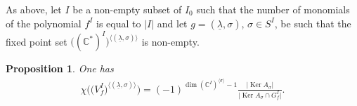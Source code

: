 \documentclass[11pt]{article}
\numberwithin{equation}{section}
\numberwithin{equation}{section}
\newtheorem{Proposition}[Theorem]{Proposition}
 { \theoremstyle{definition}
\newtheorem{Definition}[Theorem]{Definition}
\newtheorem{Remark}[Theorem]{Remark} }
\begin{document}
As above, let $I$ be a non-empty subset of $I_0$ such that the number of monomials of the polynomial $f^I$ is equal
to $|I|$ and let $g=(\underline{\lambda}, \sigma)$, $\sigma \in S^I$, be such that the fixed point set
$\big(({\mathbb C}^*)^I\big)^{\langle (\underline{\lambda}, \sigma) \rangle}$ is non-empty.

\begin{Proposition} \label{prop:Euler} One has
\begin{gather} \label{eq:Euler}
\chi\big(\big(V_f^I\big)^{\langle (\underline{\lambda}, \sigma) \rangle}\big) =
(-1)^{\dim \left({\mathbb C}^I\right)^{\langle \sigma \rangle} -1} \frac{|\operatorname{Ker} A_\sigma|}{\big|\operatorname{Ker} A_\sigma \cap G_f^I\big|}.
\end{gather}
\end{Proposition}
\end{document}
